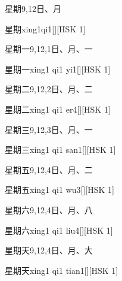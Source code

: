 \begin{Entry}{星期}{9,12}{⽇、⽉}
  \begin{Phonetics}{星期}{xing1qi1}[][HSK 1]
  \end{Phonetics}
\end{Entry}

\begin{Entry}{星期一}{9,12,1}{⽇、⽉、⼀}
  \begin{Phonetics}{星期一}{xing1 qi1 yi1}[][HSK 1]
  \end{Phonetics}
\end{Entry}

\begin{Entry}{星期二}{9,12,2}{⽇、⽉、⼆}
  \begin{Phonetics}{星期二}{xing1 qi1 er4}[][HSK 1]
  \end{Phonetics}
\end{Entry}

\begin{Entry}{星期三}{9,12,3}{⽇、⽉、⼀}
  \begin{Phonetics}{星期三}{xing1 qi1 san1}[][HSK 1]
  \end{Phonetics}
\end{Entry}

\begin{Entry}{星期五}{9,12,4}{⽇、⽉、⼆}
  \begin{Phonetics}{星期五}{xing1 qi1 wu3}[][HSK 1]
  \end{Phonetics}
\end{Entry}

\begin{Entry}{星期六}{9,12,4}{⽇、⽉、⼋}
  \begin{Phonetics}{星期六}{xing1 qi1 liu4}[][HSK 1]
  \end{Phonetics}
\end{Entry}

\begin{Entry}{星期天}{9,12,4}{⽇、⽉、⼤}
  \begin{Phonetics}{星期天}{xing1 qi1 tian1}[][HSK 1]
  \end{Phonetics}
\end{Entry}

